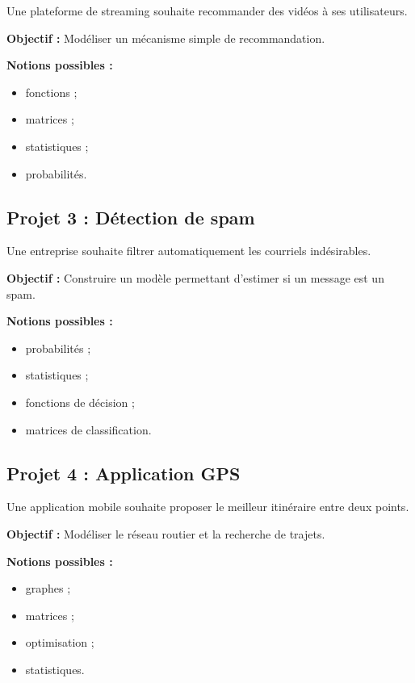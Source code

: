 \documentclass[12pt,a4paper]{article}
\begin{document}
Une plateforme de streaming souhaite recommander des vidéos à ses utilisateurs.

\textbf{Objectif :}
Modéliser un mécanisme simple de recommandation.

\textbf{Notions possibles :}

\begin{itemize}
\item fonctions ;
\item matrices ;
\item statistiques ;
\item probabilités.
\end{itemize}

\bigskip

\subsection*{Projet 3 : Détection de spam}

Une entreprise souhaite filtrer automatiquement les courriels indésirables.

\textbf{Objectif :}
Construire un modèle permettant d'estimer si un message est un spam.

\textbf{Notions possibles :}

\begin{itemize}
\item probabilités ;
\item statistiques ;
\item fonctions de décision ;
\item matrices de classification.
\end{itemize}

\bigskip

\subsection*{Projet 4 : Application GPS}

Une application mobile souhaite proposer le meilleur itinéraire entre deux points.

\textbf{Objectif :}
Modéliser le réseau routier et la recherche de trajets.

\textbf{Notions possibles :}

\begin{itemize}
\item graphes ;
\item matrices ;
\item optimisation ;
\item statistiques.
\end{itemize}
\end{document}
